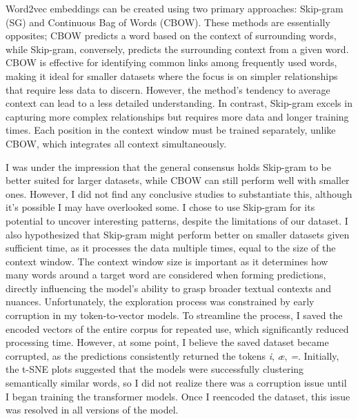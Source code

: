 \documentclass[12pt]{article} \usepackage{COSC420style} \usepackage{soul}
\begin{document}
Word2vec embeddings can be created using two primary approaches: Skip-gram (SG) and Continuous Bag
of Words (CBOW). These methods are essentially opposites; CBOW predicts a word based on the context
of surrounding words, while Skip-gram, conversely, predicts the surrounding context from a given
word. CBOW is effective for identifying common links among frequently used words, making it ideal
for smaller datasets where the focus is on simpler relationships that require less data to discern.
However, the method's tendency to average context can lead to a less detailed understanding. In
contrast, Skip-gram excels in capturing more complex relationships but requires more data and longer
training times. Each position in the context window must be trained separately, unlike CBOW, which
integrates all context simultaneously.

I was under the impression that the general consensus holds Skip-gram to be
better suited for larger datasets, while CBOW can still perform well with
smaller ones. However, I did not find any conclusive studies to substantiate
this, although it's possible I may have overlooked some. I chose to use
Skip-gram for its potential to uncover interesting patterns, despite the
limitations of our dataset. I also hypothesized that Skip-gram might perform
better on smaller datasets given sufficient time, as it processes the data
multiple times, equal to the size of the context window. The context window size
is important as it determines how many words around a target word are considered
when forming predictions, directly influencing the model’s ability to grasp
broader textual contexts and nuances. Unfortunately, the exploration process was
constrained by early corruption in my token-to-vector models. To streamline the
process, I saved the encoded vectors of the entire corpus for repeated use,
which significantly reduced processing time. However, at some point, I believe
the saved dataset became corrupted, as the predictions consistently returned the
tokens \textit{i}, \textit{\ae}, \textit{=}. Initially, the t-SNE plots
suggested that the models were successfully clustering semantically similar
words, so I did not realize there was a corruption issue until I began training
the transformer models. Once I reencoded the dataset, this issue was resolved in
all versions of the model.
\end{document}
